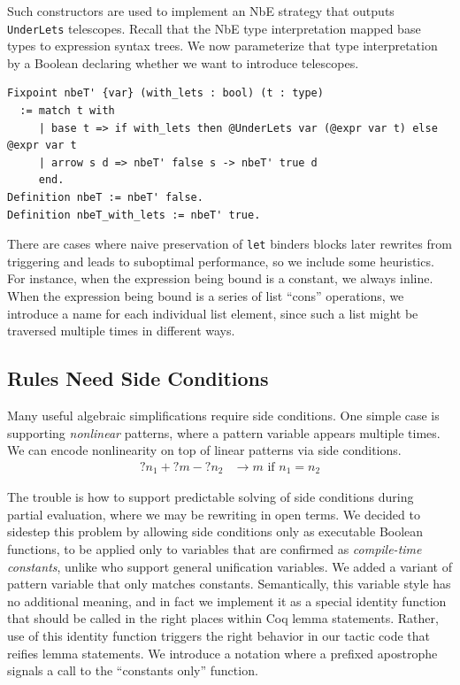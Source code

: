 Such constructors are used to implement an NbE strategy that outputs \texttt{UnderLets} telescopes.
Recall that the NbE type interpretation mapped base types to expression syntax trees.
We now parameterize that type interpretation by a Boolean declaring whether we want to introduce telescopes.

\begin{verbatim}
Fixpoint nbeT' {var} (with_lets : bool) (t : type)
  := match t with
     | base t => if with_lets then @UnderLets var (@expr var t) else @expr var t
     | arrow s d => nbeT' false s -> nbeT' true d
     end.
Definition nbeT := nbeT' false.
Definition nbeT_with_lets := nbeT' true.
\end{verbatim}


There are cases where naive preservation of \texttt{let} binders blocks later rewrites from triggering and leads to suboptimal performance, so we include some heuristics.
For instance, when the expression being bound is a constant, we always inline.
When the expression being bound is a series of list ``cons'' operations, we introduce a name for each individual list element, since such a list might be traversed multiple times in different ways.

\subsection{Rules Need Side Conditions} \label{sec:side-conditions}

Many useful algebraic simplifications require side conditions.
One simple case is supporting \emph{nonlinear} patterns, where a pattern variable appears multiple times.
We can encode nonlinearity on top of linear patterns via side conditions.
\begin{align*}
  {?n_1} + {?m} - {?n_2} & \to m\text{\ \ if\ \ }n_1 = n_2
\end{align*}

The trouble is how to support predictable solving of side conditions during partial evaluation, where we may be rewriting in open terms.
We decided to sidestep this problem by allowing side conditions only as executable Boolean functions, to be applied only to variables that are confirmed as \emph{compile-time constants}, unlike \textcite{rtac} who support general unification variables.
We added a variant of pattern variable that only matches constants.
Semantically, this variable style has no additional meaning, and in fact we implement it as a special identity function that should be called in the right places within Coq lemma statements.
Rather, use of this identity function triggers the right behavior in our tactic code that reifies lemma statements.
We introduce a notation where a prefixed apostrophe signals a call to the ``constants only'' function.

